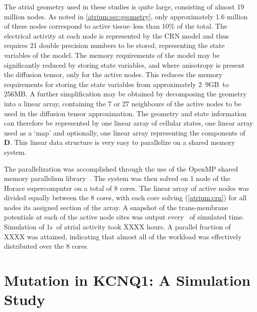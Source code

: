 The atrial geometry used in these studies is quite large, consisting of almost
19 million nodes.
As noted in \ref{atrium:sec:geometry}, only approximately 1.6 million of these
nodes correspond to active tissue--less than 10\% of the total.
The electrical activity at each node is represented by the CRN model and thus
requires 21 double precision numbers to be stored, representing the state
variables of the model.
The memory requirements of the model may be significantly reduced by storing
state variables, and where anisotropy is present the diffusion tensor, only for
the active nodes.
This reduces the memory requirements for storing the state variables from
approximately \unit{2.9}{GB}\ to \unit{256}{MB}.
A further simplification may be obtained by decomposing the geometry into a
linear array, containing the 7 or 27 neighbours of the active nodes to be used
in the diffusion tensor approximation.
The geometry and state information can therefore be represented by one linear
array of cellular states, one linear array used as a `map' and optionally, one
linear array representing the components of $\mathbf{D}$.
This linear data structure is very easy to parallelize on a shared memory
system.

The parallelization was accomplished through the use of the OpenMP shared
memory parallelism library~\cite{OpenMP}.
The system was then solved on 1 node of the Horace supercomputer on a total of 8
cores.
The linear array of active nodes was divided equally between the 8 cores, with
each core solving (\ref{atrium:crn}) for all nodes its assigned section of the
array.
A snapshot of the trans-membrane potentials at each of the active node sites was
output every \ of simulated time.
Simulation of \unit{1}{s}\ of atrial activity took XXXX hours.
A parallel fraction of XXXX was attained, indicating that almost all of the
workload was effectively distributed over the 8 cores.

\section{Mutation in KCNQ1: A Simulation Study}

